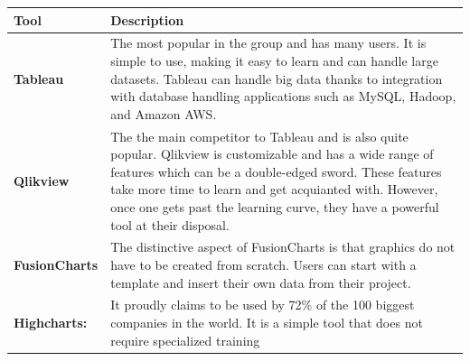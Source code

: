 \documentclass[]{book}
\theoremstyle{definition}
\theoremstyle{definition}
\theoremstyle{definition}
\theoremstyle{remark}
\begin{document}
\begin{longtable}[]{@{}ll@{}}
\toprule
\begin{minipage}[b]{0.16\columnwidth}\raggedright\strut
\textbf{Tool}\strut
\end{minipage} & \begin{minipage}[b]{0.78\columnwidth}\raggedright\strut
\textbf{Description}\strut
\end{minipage}\tabularnewline
\midrule
\endhead
\begin{minipage}[t]{0.16\columnwidth}\raggedright\strut
\textbf{Tableau}\strut
\end{minipage} & \begin{minipage}[t]{0.78\columnwidth}\raggedright\strut
The most popular in the group and has many users. It is simple to use,
making it easy to learn and can handle large datasets. Tableau can
handle big data thanks to integration with database handling
applications such as MySQL, Hadoop, and Amazon AWS.\strut
\end{minipage}\tabularnewline
\begin{minipage}[t]{0.16\columnwidth}\raggedright\strut
\textbf{Qlikview}\strut
\end{minipage} & \begin{minipage}[t]{0.78\columnwidth}\raggedright\strut
The the main competitor to Tableau and is also quite popular. Qlikview
is customizable and has a wide range of features which can be a
double-edged sword. These features take more time to learn and get
acquianted with. However, once one gets past the learning curve, they
have a powerful tool at their disposal.\strut
\end{minipage}\tabularnewline
\begin{minipage}[t]{0.16\columnwidth}\raggedright\strut
\textbf{FusionCharts}\strut
\end{minipage} & \begin{minipage}[t]{0.78\columnwidth}\raggedright\strut
The distinctive aspect of FusionCharts is that graphics do not have to
be created from scratch. Users can start with a template and insert
their own data from their project.\strut
\end{minipage}\tabularnewline
\begin{minipage}[t]{0.16\columnwidth}\raggedright\strut
\textbf{Highcharts:}\strut
\end{minipage} & \begin{minipage}[t]{0.78\columnwidth}\raggedright\strut
It proudly claims to be used by 72\% of the 100 biggest companies in the
world. It is a simple tool that does not require specialized training

\end{minipage}
\end{longtable}
\end{document}
